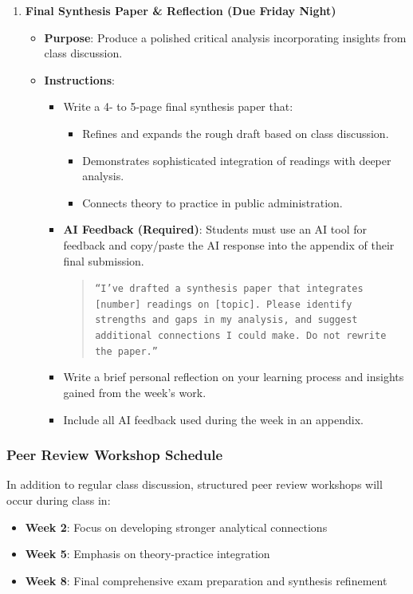 \documentclass[12pt]{article}     %
\begin{document}
\begin{enumerate}
    \item \textbf{Final Synthesis Paper \& Reflection (Due Friday Night)}
    \begin{itemize}
        \item \textbf{Purpose}: Produce a polished critical analysis incorporating insights from class discussion.
        \item \textbf{Instructions}:
        \begin{itemize}
            \item Write a 4- to 5-page final synthesis paper that:
            \begin{itemize}
                \item Refines and expands the rough draft based on class discussion.
                \item Demonstrates sophisticated integration of readings with deeper analysis.
                \item Connects theory to practice in public administration.
            \end{itemize}
            \item \textbf{AI Feedback (Required)}: Students must use an AI tool for feedback and copy/paste the AI response into the appendix of their final submission.  
            \begin{quote}
                \texttt{``I've drafted a synthesis paper that integrates [number] readings on [topic]. Please identify strengths and gaps in my analysis, and suggest additional connections I could make. Do not rewrite the paper.''}
            \end{quote}
            \item Write a brief personal reflection on your learning process and insights gained from the week's work.
            \item Include all AI feedback used during the week in an appendix.
        \end{itemize}
    \end{itemize}
\end{enumerate}

\subsubsection*{Peer Review Workshop Schedule}

In addition to regular class discussion, structured peer review workshops will occur during class in:
\begin{itemize}
    \item \textbf{Week 2}: Focus on developing stronger analytical connections
    \item \textbf{Week 5}: Emphasis on theory-practice integration
    \item \textbf{Week 8}: Final comprehensive exam preparation and synthesis refinement
\end{itemize}
\end{document}
